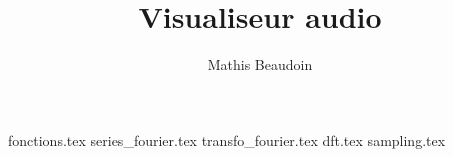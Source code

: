 \documentclass{article}
\title{\textbf{Visualiseur audio}}
\author{Mathis Beaudoin}
\date{}
\numberwithin{equation}{section}
\begin{document}

\maketitle
\clearpage

\tableofcontents
\clearpage


\newpage
{}
\setcounter{page}{1}

{fonctions.tex}
{series_fourier.tex}
{transfo_fourier.tex}
{dft.tex}
{sampling.tex}

\newpage
\nocite{*}
 

\end{document}
